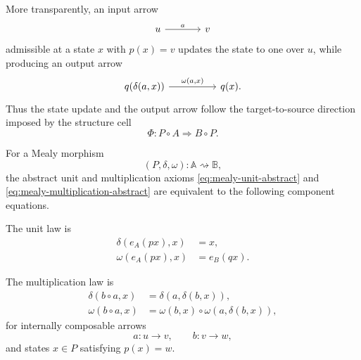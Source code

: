More transparently, an input arrow
\[
    \begin{tikzcd}[column sep=large]
            u 
                \arrow[r, "a"] 
        & 
            v
    \end{tikzcd}
\]
admissible at a state \(x\) with \(p(x)=v\) updates the state to one over \(u\), while producing an output arrow
\[
\begin{tikzcd}[column sep=huge]
        {q(\delta(a,x))}
            \arrow[r, "{\omega(a,x)}"]
    &
        {q(x)}.
\end{tikzcd}
\]
Thus the state update and the output arrow follow the target-to-source direction imposed by the structure cell
\[
    \Phi:P\circ A\Rightarrow B\circ P.
\]

\begin{proposition}
\label{prop:mealy-laws}
    For a Mealy morphism
    \[
        (P,\delta,\omega):\mathbb A\rightsquigarrow\mathbb B,
    \]
    the abstract unit and multiplication axioms \eqref{eq:mealy-unit-abstract} and \eqref{eq:mealy-multiplication-abstract} are equivalent to the following component equations.

    The unit law is
    \begin{align}
        \delta(e_A(p x),x)&=x,
        \label{eq:delta-unit}
        \\
        \omega(e_A(p x),x)&=e_B(qx).
        \label{eq:omega-unit}
    \end{align}

    The multiplication law is
    \begin{align}
        \delta(b\circ a,x)
        &=
        \delta(a,\delta(b,x)),
        \label{eq:delta-composition}
        \\
        \omega(b\circ a,x)
        &=
        \omega(b,x)\circ \omega(a,\delta(b,x)),
        \label{eq:omega-composition}
    \end{align}
    for internally composable arrows
    \[
        a:u\to v,
        \qquad
        b:v\to w,
    \]
    and states \(x\in P\) satisfying \(p(x)=w\).
\end{proposition}
